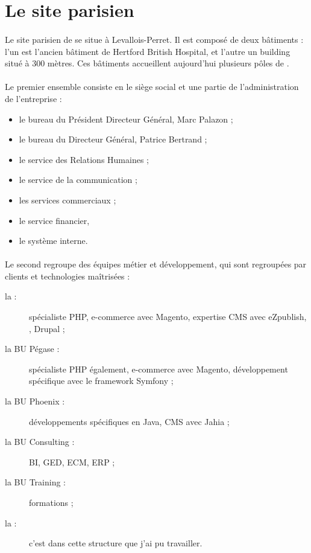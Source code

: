 \section{Le site parisien}

\paragraph{}
Le site parisien de \asmile{} se situe à Levallois-Perret.
Il est composé de deux bâtiments : l'un est l'ancien bâtiment de Hertford British Hospital, et l'autre un building situé à 300 mètres.
Ces bâtiments accueillent aujourd'hui plusieurs pôles de \asmile{}.

\paragraph{}
Le premier ensemble consiste en le siège social et une partie de l'administration de l'entreprise :

\begin{itemize}
	\item le bureau du Président Directeur Général, Marc Palazon ;
	\item le bureau du Directeur Général, Patrice Bertrand ;
	\item le service des Relations Humaines ;
	\item le service de la communication ;
	\item les services commerciaux ;
	\item le service financier,
	\item le système interne.
\end{itemize}

\paragraph{}
Le second regroupe des équipes métier et développement, qui sont regroupées par clients et technologies maîtrisées :

\begin{description}
	\item[la \abugan{} :] spécialiste PHP, e-commerce avec Magento, expertise CMS avec eZpublish, \atypo{}, Drupal ;
	\item[la BU Pégase :] spécialiste PHP également, e-commerce avec Magento, développement spécifique avec le framework Symfony ;
	\item[la BU Phoenix :] développements spécifiques en Java, CMS avec Jahia ;
	\item[la BU Consulting :] BI, GED, ECM, ERP ;
	\item[la BU Training :] formations ;
	\item[la \abusys{} :] c'est dans cette structure que j'ai pu travailler.
\end{description}


